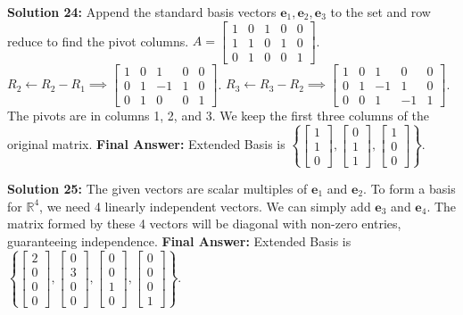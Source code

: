 \documentclass[11pt]{article}
\begin{document}
\vspace{0.5cm}
\textbf{Solution 24:}
Append the standard basis vectors $\mathbf{e}_1, \mathbf{e}_2, \mathbf{e}_3$ to the set and row reduce to find the pivot columns.
$A = \begin{bmatrix} 1 & 0 & 1 & 0 & 0 \\ 1 & 1 & 0 & 1 & 0 \\ 0 & 1 & 0 & 0 & 1 \end{bmatrix}$.
$R_2 \leftarrow R_2 - R_1 \implies \begin{bmatrix} 1 & 0 & 1 & 0 & 0 \\ 0 & 1 & -1 & 1 & 0 \\ 0 & 1 & 0 & 0 & 1 \end{bmatrix}$.
$R_3 \leftarrow R_3 - R_2 \implies \begin{bmatrix} 1 & 0 & 1 & 0 & 0 \\ 0 & 1 & -1 & 1 & 0 \\ 0 & 0 & 1 & -1 & 1 \end{bmatrix}$.
The pivots are in columns 1, 2, and 3. We keep the first three columns of the original matrix.
\textbf{Final Answer:} Extended Basis is $\left\{ \begin{bmatrix} 1 \\ 1 \\ 0 \end{bmatrix}, \begin{bmatrix} 0 \\ 1 \\ 1 \end{bmatrix}, \begin{bmatrix} 1 \\ 0 \\ 0 \end{bmatrix} \right\}$.

\vspace{0.5cm}
\textbf{Solution 25:}
The given vectors are scalar multiples of $\mathbf{e}_1$ and $\mathbf{e}_2$. To form a basis for $\mathbb{R}^4$, we need 4 linearly independent vectors. We can simply add $\mathbf{e}_3$ and $\mathbf{e}_4$. The matrix formed by these 4 vectors will be diagonal with non-zero entries, guaranteeing independence.
\textbf{Final Answer:} Extended Basis is $\left\{ \begin{bmatrix} 2 \\ 0 \\ 0 \\ 0 \end{bmatrix}, \begin{bmatrix} 0 \\ 3 \\ 0 \\ 0 \end{bmatrix}, \begin{bmatrix} 0 \\ 0 \\ 1 \\ 0 \end{bmatrix}, \begin{bmatrix} 0 \\ 0 \\ 0 \\ 1 \end{bmatrix} \right\}$.
\end{document}
